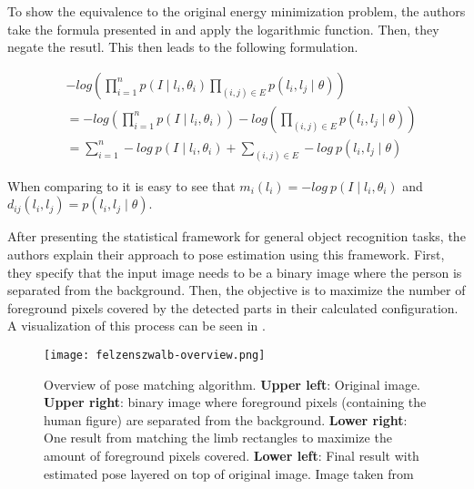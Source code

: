 To show the equivalence to the original energy minimization problem, the authors take the formula presented in  and apply the logarithmic function. Then, they negate the resutl.
This then leads to the following formulation.

\begin{equation}
    \label{eq:neg-log-posterior}
    \begin{split}
        &-log \left( \prod_{i=1}^n p(I \mid l_i, \theta_i) \prod_{(i, j) \in E} p(l_i, l_j \mid \theta) \right) \\
        &= -log \left( \prod_{i=1}^n p(I \mid l_i, \theta_i) \right) - log \left( \prod_{(i, j) \in E} p(l_i, l_j \mid \theta)\right) \\
        &= \sum_{i=1}^n -log ~ p(I \mid l_i, \theta_i) + \sum_{(i, j) \in E} - log ~ p(l_i, l_j \mid \theta)
    \end{split}
\end{equation}

When comparing  to  it is easy to see that $m_i(l_i) = - log ~ p(I \mid l_i, \theta_i)$ and $d_{ij}(l_i, l_j) = p(l_i, l_j \mid \theta)$.

After presenting the statistical framework for general object recognition tasks, the authors explain their approach to pose estimation using this framework.
First, they specify that the input image needs to be a binary image where the person is separated from the background.
Then, the objective is to maximize the number of foreground pixels covered by the detected parts in their calculated configuration.
A visualization of this process can be seen in .

\begin{figure}[htb!]
    \centering
    \texttt{[image: felzenszwalb-overview.png]}
    \caption{Overview of pose matching algorithm. \textbf{Upper left}: Original image. \textbf{Upper right}: binary image where foreground pixels (containing the human figure) are separated from the background. \textbf{Lower right}: One result from matching the limb rectangles to maximize the amount of foreground pixels covered. \textbf{Lower left}: Final result with estimated pose layered on top of original image. Image taken from \cite{felzenszwalb_pictorial_2005}}
    \label{fig:felzenszwalb-overview}
\end{figure}

